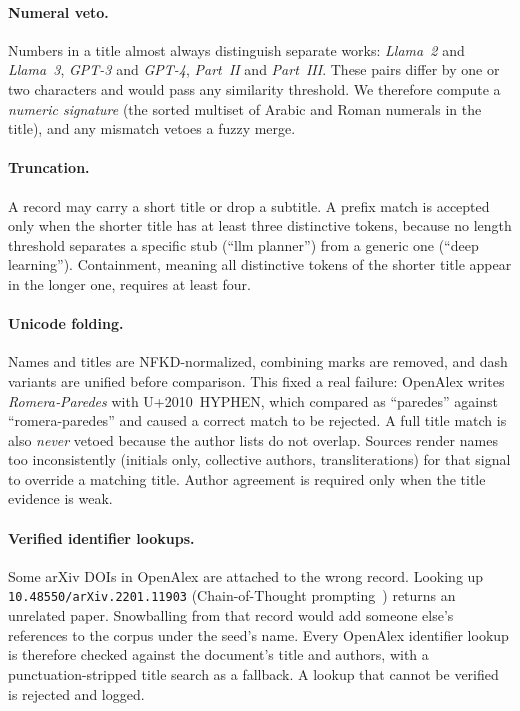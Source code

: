 \documentclass{article}
\newcommand{\code}[1]{\texttt{#1}}
\begin{document}
\paragraph{Numeral veto.} Numbers in a title almost always distinguish
separate works: \emph{Llama~2} and \emph{Llama~3}, \emph{GPT-3} and
\emph{GPT-4}, \emph{Part~II} and \emph{Part~III}. These pairs differ by one
or two characters and would pass any similarity threshold. We therefore
compute a \emph{numeric signature} (the sorted multiset of Arabic and Roman
numerals in the title), and any mismatch vetoes a fuzzy merge.

\paragraph{Truncation.} A record may carry a short title or drop a
subtitle. A prefix match is accepted only when the shorter title has at
least three distinctive tokens, because no length threshold separates a
specific stub (``llm planner'') from a generic one (``deep learning'').
Containment, meaning all distinctive tokens of the shorter title appear in
the longer one, requires at least four.

\paragraph{Unicode folding.} Names and titles are NFKD-normalized, combining
marks are removed, and dash variants are unified before comparison. This
fixed a real failure: OpenAlex writes \emph{Romera‐Paredes} with
U+2010~HYPHEN, which compared as ``paredes'' against ``romera-paredes'' and
caused a correct match to be rejected. A full title match is also
\emph{never} vetoed because the author lists do not overlap. Sources
render names too inconsistently (initials only, collective authors,
transliterations) for that signal to override a matching title. Author
agreement is required only when the title evidence is weak.

\paragraph{Verified identifier lookups.} Some arXiv DOIs in OpenAlex are
attached to the wrong record. Looking up \code{10.48550/arXiv.2201.11903}
(Chain-of-Thought prompting~\citep{wei2022cot}) returns an unrelated paper.
Snowballing from that record would add someone else's references to the
corpus under the seed's name. Every OpenAlex identifier lookup is therefore
checked against the document's title and authors, with a
punctuation-stripped title search as a fallback. A lookup that cannot be
verified is rejected and logged.
\end{document}
